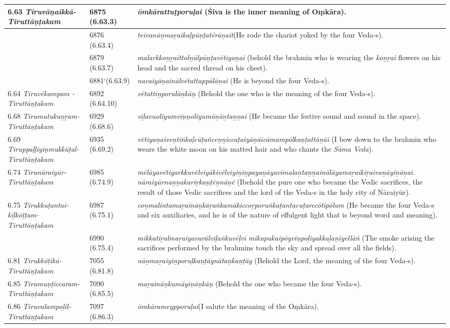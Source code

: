 \begin{longtable}{|m{2.7cm}|m{2.7cm}|>{\raggedright}m{3cm}|}
\hline
6.63 \textit{Tiruvāṉaikkā- Tiruttāṇṭakam} & 6875 (6.63.3) & \textit{ōmkārattuṭporuḷai} (Śiva is the inner meaning of   Oṃkāra). \tabularnewline
\hline
 & 6876 (6.63.4) & \textit{teivanāṉmaṟaikaḷpūṇ\-ṭatērāṉait}(He rode the chariot yoked by the four Veda-s). \tabularnewline
\hline
 & 6879 (6.63.7) & \textit{malarkkoṉṟaittolṉūl\-pūṇṭavētiyaṉai} (behold the brahmin who is wearing the \textit{koṉṟai} flowers on his head and the sacred thread on his chest). \tabularnewline
\hline
 & 6881`(6.63.9) & \textit{nacaiyāṉainālvētatta\-ppālāṉai} (He is beyond the four Veda-s). \tabularnewline
\hline
6.64 \textit{Tiruvēkampam - Tiruttāṇṭakam} & 6892 (6.64.10) & \textit{vētattiṉporulāṉkāṇ} (Behold the one who is the meaning of the four Veda-s). \tabularnewline
\hline
6.68 \textit{Tirumutukuṉ\-ṟam-Tiruttāṇ\-ṭakam} & 6929 (6.68.6) & \textit{viḻavuoliyumviṇṇoli\-yumāṉāṉtaṉṉai} (He became the festive sound and sound in the space). \tabularnewline
\hline
6.69 \textit{Tiruppaḷḷiyiṇmu\-kkūṭal-Tiruttāṇ\-ṭakam} & 6935 (6.69.2) & \textit{vētiyaṉaiveṇtiṅkaḷcū\-ṭuñceṉṉiccaṭaiyāṉāi\-cāmampōlkaṇṭattāṉāi} (I bow down to the brahmin who wears the white moon on his matted hair  and who chants the \textit{Sāma Veda}). \tabularnewline
\hline
6.74 \textit{Tirunāraiyūr- Tiruttāṇṭakam} & 6985 (6.74.9) & \textit{mēlāyavētiyarkkuvēl\-viyākivēlviyiṉiṉpaya\-ṉāyavimalaṉtaṉṉai\-nālāyamaṟaikiṟaiva\-ṉāyiṉāṉai. nāraiyūrnaṉṉakariṟkaṇṭēṉnāṉē} (Ibehold the pure one who became the Vedic sacrifices, the result of those Vedic sacrifices and the lord of the Veda-s in the holy city of Nāraiyūr). \tabularnewline
\hline
6.75 \textit{Tirukkuṭantai-kīḻkōṭṭam- Tiruttāṇ\-ṭakam} & 6987 (6.75.1) & \textit{coṉmalintamaṟaināṉ\-kāṟaṅkamākiccoṟpo\-ruṅkaṭantacuṭarccōti\-pōlum} (He became the four Veda-s and six auxiliaries, and he is of the nature of effulgent light that is beyond word and meaning). \tabularnewline
\hline
 & 6990 (6.75.4) & \textit{mikkatiṟalmaṟaiyava\-rālviḷaṅkuvēḷvi mikupukaipōyviṇpoḻi\-yakkaḻaṉiyellāṅ}  (The smoke arising the sacrifices performed by the brahmins touch the sky and spread over all the fields). \tabularnewline
\hline
6.81 \textit{Tirukkōṭikā- Tiruttāṇṭakam} & 7055 (6.81.8) & \textit{nāṉmaṟaiyiṉporuḷkaṇ\-ṭāynātaṇkaṇṭāy} (Behold  the Lord, the meaning of the four Veda-s). \tabularnewline
\hline
6.85 \textit{Tirumuṇṭīccaram- Tiruttāṇṭakam} & 7090 (6.85.5) & \textit{maṟaināṉkumāyiṉāṉ\-kāṇ} (Behold the one who became the four Veda-s). \tabularnewline
\hline
6.86 \textit{Tiruvalampoḻil- Tiruttāṇṭakam} & 7097 (6.86.3) & \textit{ōmkārameypporuḷai}\break  (I salute the meaning of the Oṃkāra). \tabularnewline

\end{longtable}
